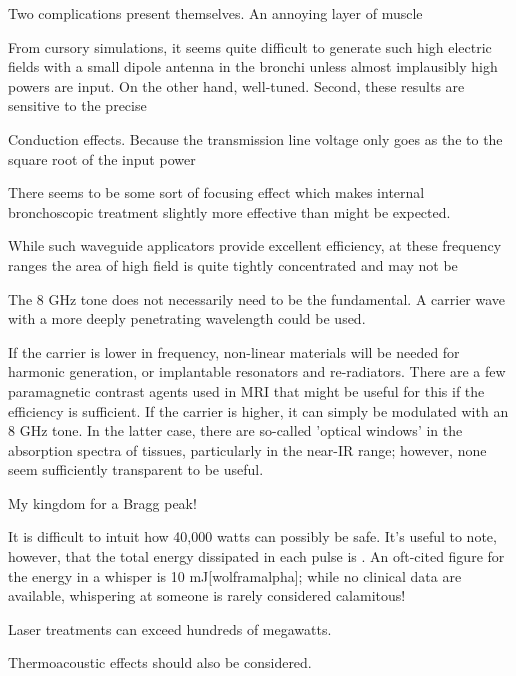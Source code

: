\documentclass[paper.tex]{subfiles}
\begin{document}
Two complications present themselves. An annoying layer of muscle 


From cursory simulations, it seems quite difficult to generate such high electric fields with a small dipole antenna in the bronchi unless almost implausibly high powers are input. On the other hand, well-tuned. Second, these results are sensitive to the precise




Conduction effects. Because the transmission line voltage only goes as the to the square root of the input power

There seems to be some sort of focusing effect which makes internal bronchoscopic treatment slightly more effective than might be expected.


While such waveguide applicators provide excellent efficiency, at these frequency ranges the area of high field is quite tightly concentrated and may not be 



The 8 GHz tone does not necessarily need to be the fundamental. A carrier wave with a more deeply penetrating wavelength could be used. 

If the carrier is lower in frequency, non-linear materials\cite{Theory1973} will be needed for harmonic generation, or implantable resonators and re-radiators. There are a few paramagnetic contrast agents used in MRI that might be useful for this if the efficiency is sufficient. If the carrier is higher, it can simply be modulated with an 8 GHz tone. In the latter case, there are so-called 'optical windows' in the absorption spectra of tissues, particularly in the near-IR range; however, none seem sufficiently transparent to be useful.

My kingdom for a Bragg peak!



It is difficult to intuit how 40,000 watts can possibly be safe. It's useful to note, however, that the total energy dissipated in each pulse is . An oft-cited figure for the energy in a whisper is 10 mJ[wolframalpha]; while no clinical data are available, whispering at someone is rarely considered calamitous\citationneeded!

Laser treatments can exceed hundreds of megawatts.


Thermoacoustic effects should also be considered.



\clearpage
\printbibliography[heading=none, title={}, keyword={standards}]
\end{document}
